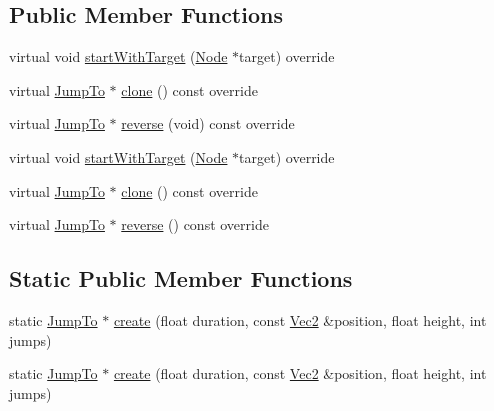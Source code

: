 \subsection*{Public Member Functions}
\begin{DoxyCompactItemize}
\item 
virtual void \hyperlink{classJumpTo_abb2372358d593932355300cb89a79f96}{start\+With\+Target} (\hyperlink{classNode}{Node} $\ast$target) override
\item 
virtual \hyperlink{classJumpTo}{Jump\+To} $\ast$ \hyperlink{classJumpTo_a1ec85fd4b3d2190aee432923aea136c2}{clone} () const override
\item 
virtual \hyperlink{classJumpTo}{Jump\+To} $\ast$ \hyperlink{classJumpTo_adc71d1883b687ba53a86a5a42c20faa4}{reverse} (void) const override
\item 
virtual void \hyperlink{classJumpTo_a64047a3cb37ccad99f74e6d1ee9dc271}{start\+With\+Target} (\hyperlink{classNode}{Node} $\ast$target) override
\item 
virtual \hyperlink{classJumpTo}{Jump\+To} $\ast$ \hyperlink{classJumpTo_aba7a2048b180db1b73224953dc42649e}{clone} () const override
\item 
virtual \hyperlink{classJumpTo}{Jump\+To} $\ast$ \hyperlink{classJumpTo_a56d2aef2280cbced862f0d7cf006f20e}{reverse} () const override
\end{DoxyCompactItemize}
\subsection*{Static Public Member Functions}
\begin{DoxyCompactItemize}
\item 
static \hyperlink{classJumpTo}{Jump\+To} $\ast$ \hyperlink{classJumpTo_a1a35ad2d714edc77bab9966e422abb66}{create} (float duration, const \hyperlink{classVec2}{Vec2} \&position, float height, int jumps)
\item 
static \hyperlink{classJumpTo}{Jump\+To} $\ast$ \hyperlink{classJumpTo_a9f5bc30e7507db371e8f626935a40fd8}{create} (float duration, const \hyperlink{classVec2}{Vec2} \&position, float height, int jumps)
\end{DoxyCompactItemize}
